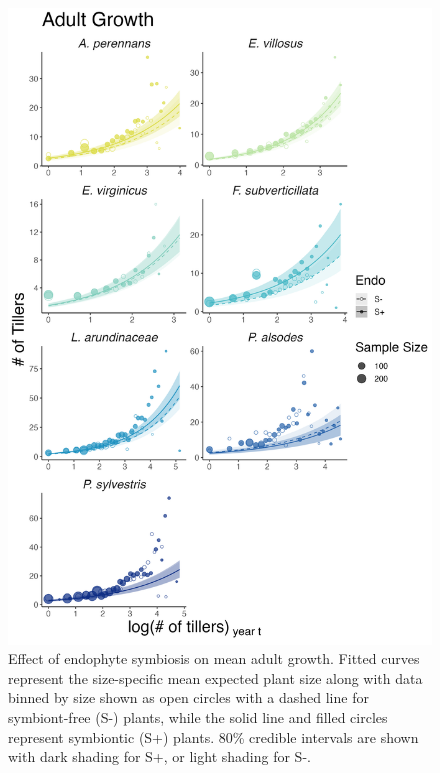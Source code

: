 \documentclass[9pt,twoside,lineno]{pnas-new}
\begin{document}
\begin{figure}
	\centering
	\includegraphics[width=.6\linewidth]{grow_meanplot.png}
	\caption{Effect of endophyte symbiosis on mean adult growth. Fitted curves represent the size-specific mean expected plant size along with data binned by size shown as open circles with a dashed line for symbiont-free (S-) plants, while the solid line and filled circles represent symbiontic (S+) plants. 80\% credible intervals are shown with dark shading for  S+, or light shading for S-.}
\end{figure}
\end{document}
